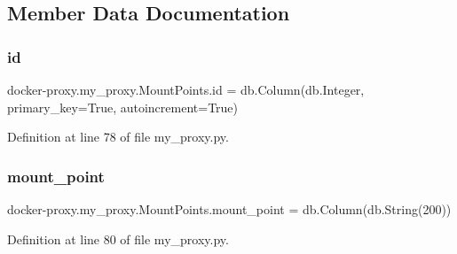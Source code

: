 \subsection{Member Data Documentation}
\hypertarget{classdocker-proxy_1_1my__proxy_1_1_mount_points_a17378df4d222e5d86f97d966e5ba30ee}{}\label{classdocker-proxy_1_1my__proxy_1_1_mount_points_a17378df4d222e5d86f97d966e5ba30ee} 
\subsubsection{\texorpdfstring{id}{id}}
{\footnotesize\ttfamily docker-\/proxy.\+my\+\_\+proxy.\+Mount\+Points.\+id = db.\+Column(db.\+Integer, primary\+\_\+key=True, autoincrement=True)\hspace{0.3cm}{\ttfamily [static]}}



Definition at line 78 of file my\+\_\+proxy.\+py.

\hypertarget{classdocker-proxy_1_1my__proxy_1_1_mount_points_aa7cfbe6eb066a60a4b6a0399fc64e003}{}\label{classdocker-proxy_1_1my__proxy_1_1_mount_points_aa7cfbe6eb066a60a4b6a0399fc64e003} 
\subsubsection{\texorpdfstring{mount\+\_\+point}{mount\_point}}
{\footnotesize\ttfamily docker-\/proxy.\+my\+\_\+proxy.\+Mount\+Points.\+mount\+\_\+point = db.\+Column(db.\+String(200))\hspace{0.3cm}{\ttfamily [static]}}



Definition at line 80 of file my\+\_\+proxy.\+py.

\hypertarget{classdocker-proxy_1_1my__proxy_1_1_mount_points_aa49cde7530c0edaec96a4407707e714d}{}\label{classdocker-proxy_1_1my__proxy_1_1_mount_points_aa49cde7530c0edaec96a4407707e714d} 
